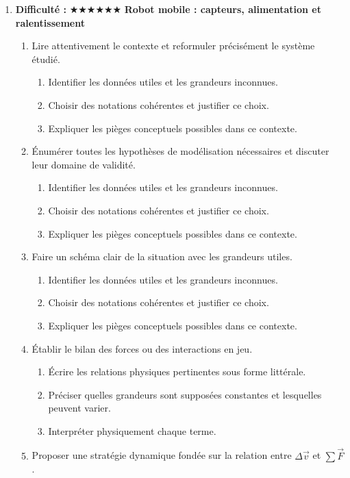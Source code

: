 \documentclass[11pt,a4paper]{article}
\newcommand{\etoiles}[1]{\textbf{Difficulté : }#1}
\begin{document}
\begin{enumerate}[label=\textbf{Très long \arabic*.},leftmargin=*]
\begin{enumerate}[label=\textbf{\arabic*)}]
\begin{enumerate}[label=\alph*)]
\end{enumerate}
\end{enumerate}
\item \etoiles{★★★★★★}
\textbf{Robot mobile : capteurs, alimentation et ralentissement}
\begin{enumerate}[label=\textbf{\arabic*)}]
\item Lire attentivement le contexte et reformuler précisément le système étudié.
\begin{enumerate}[label=\alph*)]
\item Identifier les données utiles et les grandeurs inconnues.
\item Choisir des notations cohérentes et justifier ce choix.
\item Expliquer les pièges conceptuels possibles dans ce contexte.
\end{enumerate}
\item Énumérer toutes les hypothèses de modélisation nécessaires et discuter leur domaine de validité.
\begin{enumerate}[label=\alph*)]
\item Identifier les données utiles et les grandeurs inconnues.
\item Choisir des notations cohérentes et justifier ce choix.
\item Expliquer les pièges conceptuels possibles dans ce contexte.
\end{enumerate}
\item Faire un schéma clair de la situation avec les grandeurs utiles.
\begin{enumerate}[label=\alph*)]
\item Identifier les données utiles et les grandeurs inconnues.
\item Choisir des notations cohérentes et justifier ce choix.
\item Expliquer les pièges conceptuels possibles dans ce contexte.
\end{enumerate}
\item Établir le bilan des forces ou des interactions en jeu.
\begin{enumerate}[label=\alph*)]
\item Écrire les relations physiques pertinentes sous forme littérale.
\item Préciser quelles grandeurs sont supposées constantes et lesquelles peuvent varier.
\item Interpréter physiquement chaque terme.
\end{enumerate}
\item Proposer une stratégie dynamique fondée sur la relation entre $\Delta\vec v$ et $\sum\vec F$.

\end{enumerate}
\end{enumerate}
\end{document}
